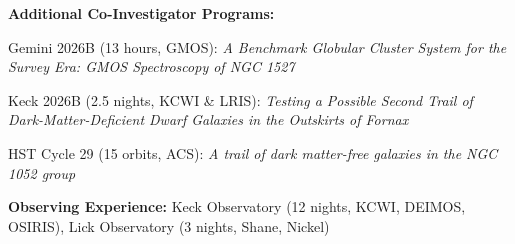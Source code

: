 \documentclass[letterpaper,11pt]{article}
\begin{document}
\vspace{-0.2cm}
{\bf Additional Co-Investigator Programs:}
\vspace{-0.2cm}
\begin{etaremune}[itemsep=0pt]
\item Gemini 2026B (13 hours, GMOS): {\em A Benchmark Globular Cluster System for the Survey Era: GMOS Spectroscopy of NGC 1527}
\item Keck 2026B (2.5 nights, KCWI \& LRIS): {\em Testing a Possible Second Trail of Dark-Matter-Deficient Dwarf Galaxies in the Outskirts of Fornax}
\item HST Cycle 29 (15 orbits, ACS): {\em A trail of dark matter-free galaxies in the NGC 1052 group}
\end{etaremune}
{\bf Observing Experience: }{Keck Observatory (12 nights, KCWI, DEIMOS, OSIRIS), Lick Observatory (3 nights, Shane, Nickel)}
\end{document}
